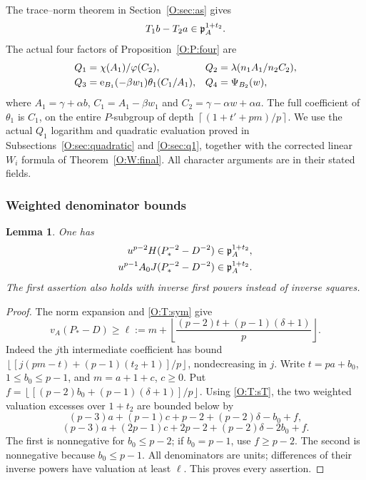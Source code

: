 \documentclass[11pt]{amsart}
\newtheorem{lemma}[theorem]{Lemma}
\theoremstyle{definition}
\theoremstyle{remark}
\newcommand{\ceil}[1]{\left\lceil #1\right\rceil}
\newcommand{\floor}[1]{\left\lfloor #1\right\rfloor}
\newcommand{\ee}{\mathrm e}\newcommand{\echar}{\mathrm e}\newcommand{\FF}{\mathbf F}
\begin{document}
The trace--norm theorem in Section~\ref{O:sec:as} gives
\begin{equation}\label{O:T:H14}
 T_1b-T_2a\in\mathfrak p_A^{1+t_2}.
\end{equation}
The actual four factors of Proposition~\ref{O:P:four} are
\begin{align}\label{O:T:factors}
 Q_1&=\chi(A_1)/\varphi(C_2),&
 Q_2&=\lambda(n_1A_1/n_2C_2),\notag\\
 Q_3&=\ee_{B_1}(-\beta w_1)\theta_1(C_1/A_1),&
 Q_4&=\Psi_{B_2}(w),
\end{align}
where $A_1=\gamma+\alpha b$, $C_1=A_1-\beta w_1$ and
$C_2=\gamma-\alpha w+\alpha a$.
The full coefficient of $\theta_1$ is $C_1$, on the entire
$P$-subgroup of depth $\ceil{(1+t'+pm)/p}$.
We use the actual $Q_1$ logarithm and quadratic evaluation proved in
Subsections~\ref{O:sec:quadratic} and \ref{O:sec:q1}, together with the corrected linear $W_i$ formula of Theorem~\ref{O:W:final}.
All character arguments are in their stated fields.

\subsubsection*{Weighted denominator bounds}
\begin{lemma}\label{O:T:denominator}
One has
\begin{align}\label{O:T:weightedden}
 u^{p-2}H(P_*^{-2}-D^{-2})&\in\mathfrak p_A^{1+t_2},\notag\\
 u^{p-1}A_0J(P_*^{-2}-D^{-2})&\in\mathfrak p_A^{1+t_2}.
\end{align}
The first assertion also holds with inverse first powers instead of
inverse squares.
\end{lemma}
\begin{proof}
The norm expansion and \eqref{O:T:sym} give
\[
 v_A(P_*-D)\ge\ell:=m+
 \floor{\frac{(p-2)t+(p-1)(\delta+1)}p}.
\]
Indeed the $j$th intermediate coefficient has bound
$\floor{[j(pm-t)+(p-1)(t_2+1)]/p}$, nondecreasing in $j$.
Write $t=pa+b_0$, $1\le b_0\le p-1$, and $m=a+1+c$, $c\ge0$.
Put $f=\floor{[(p-2)b_0+(p-1)(\delta+1)]/p}$.
Using \eqref{O:T:sT}, the two weighted valuation excesses over $1+t_2$
are bounded below by
\[
 (p-3)a+(p-1)c+p-2+(p-2)\delta-b_0+f,
\]
\[
 (p-3)a+(2p-1)c+2p-2+(p-2)\delta-2b_0+f.
\]
The first is nonnegative for $b_0\le p-2$; if $b_0=p-1$, use
$f\ge p-2$. The second is nonnegative because $b_0\le p-1$.
All denominators are units; differences of their inverse powers have
valuation at least $\ell$. This proves every assertion.
\end{proof}
\end{document}
